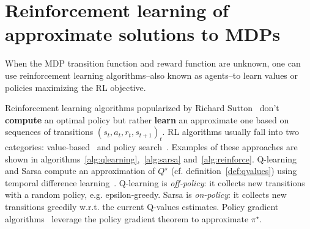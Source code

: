\section{Reinforcement learning of approximate solutions to MDPs}\label{sec:rl}
When the MDP transition function and reward function are unknown, one can use reinforcement learning algorithms--also known as agents--to learn values or policies maximizing the RL objective. 

Reinforcement learning algorithms popularized by Richard Sutton~\cite{sutton} don't \textbf{compute} an optimal policy but rather \textbf{learn} an approximate one based on sequences of transitions $(s_t, a_t, r_t, s_{t+1})_t$.
RL algorithms usually fall into two categories: value-based~\cite{sutton} and policy search~\cite{pg_sutton}.
Examples of these approaches are shown in algorithms~\ref{alg:qlearning},~\ref{alg:sarsa} and~\ref{alg:reinforce}.
Q-learning and Sarsa compute an approximation of $Q^{\star}$ (cf. definition~\ref{def:qvalues}) using temporal difference learning~\cite{sutton}. Q-learning is \textit{off-policy}: it collects new transitions with a random policy, e.g. epsilon-greedy. Sarsa is \textit{on-policy}: it collects new transitions greedily w.r.t. the current Q-values estimates.
Policy gradient algorithms~\cite{pg_sutton} leverage the policy gradient theorem to approximate $\pi^{\star}$.

